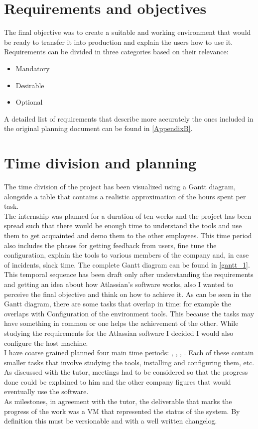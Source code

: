 \section{Requirements and objectives}
	The final objective was to create a suitable and working environment that would be ready to transfer it into production and explain the users how to use it.\\
	Requirements can be divided in three categories based on their relevance:
	\begin{itemize}
		\item Mandatory
		\item Desirable
		\item Optional
	\end{itemize}
	A detailed list of requirements that describe more accurately the ones included in the original planning document can be found in \ref{AppendixB}.
	
\section{Time division and planning}\label{sec:time_planning}
	The time division of the project has been visualized using a Gantt diagram, alongside a table that contains a realistic approximation of the hours spent per task.\\
	The internship was planned for a duration of ten weeks and the project has been spread such that there would be enough time to understand the tools and use them to get acquainted and demo them to the other employees.
	This time period also includes the phases for getting feedback from users, fine tune the configuration, explain the tools to various members of the company and, in case of incidents, slack time.
	The complete Gantt diagram can be found in \ref{gantt_1}.\\
	This temporal sequence has been draft only after understanding the requirements and getting an idea about how Atlassian's software works, also I wanted to perceive the final objective and think on how to achieve it.
	As can be seen in the Gantt diagram, there are some tasks that overlap in time: for example the  overlaps with Configuration of the environment tools.
	This because the tasks may have something in common or one helps the achievement of the other.
	While studying the requirements for the Atlassian software I decided I would also configure the host machine.\\
	I have coarse grained planned four main time periods: , , , .
	Each of these contain smaller tasks that involve studying the tools, installing and configuring them, etc.\\
	As discussed with the tutor, meetings had to be considered so that the progress done could be explained to him and the other company figures that would eventually use the software.\\
	As \gls{milestones}, in agreement with the tutor, the deliverable that marks the progress of the work was a VM that represented the status of the system.
	By definition this must be versionable and with a well written changelog.
	
